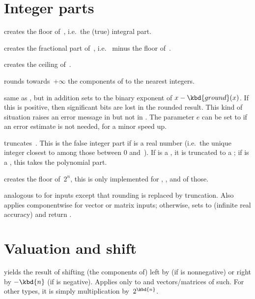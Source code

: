 \section{Integer parts}

 creates the floor of~, i.e.\ the (true)
integral part.

 creates the fractional part of~, i.e.\ 
minus the floor of~.

 creates the ceiling of~.

 rounds towards~$+\infty$ the components of 
to the nearest integers.

 same as , but in addition sets
 to the binary exponent of $x - \kbd{ground}(x)$. If this is
positive, then significant bits are lost in the rounded result. This kind of
situation raises an error message in  but not in .
The parameter $e$ can be set to  if an error estimate is not
needed, for a minor speed up.

 truncates~. This is the false integer part
if  is a real number (i.e.~the unique integer closest to  among
those between 0 and~). If  is a , it is truncated
to a ; if  is a , this takes the polynomial part.

 creates the floor of~$2^n$, this is
only implemented for , ,  and  of
those.

 analogous to  for
 inputs except that rounding is replaced by truncation. Also applies
componentwise for vector or matrix inputs; otherwise, sets  to
 (infinite real accuracy) and return .

\section{Valuation and shift}

 yields the result of shifting
(the components of)  left by  (if  is nonnegative)
or right by $-\kbd{n}$ (if  is negative). Applies only to 
and vectors/matrices of such. For other types, it is simply multiplication
by~$2^{\kbd{n}}$.

